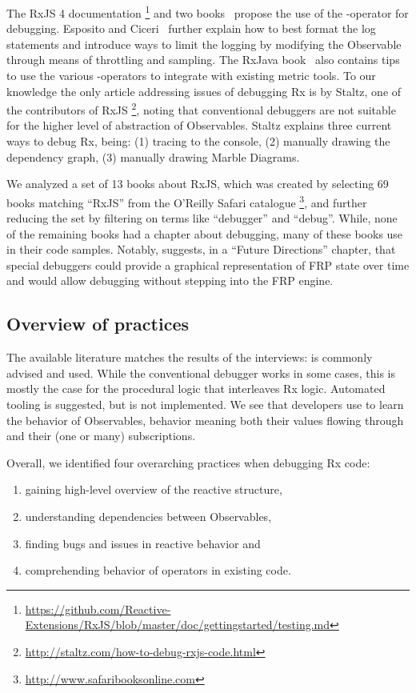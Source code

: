 The RxJS 4 documentation%
\footnote{ \url{https://github.com/Reactive-Extensions/RxJS/blob/master/doc/gettingstarted/testing.md}
} and two books~\cite{esposito2016reactive,rxjavabook2016} propose the
use of the -operator for debugging.  Esposito and Ciceri~\cite{esposito2016reactive}
further explain how to best format the log statements and introduce ways
to limit the logging by modifying the Observable through means of
throttling and sampling.  The RxJava book~\cite{rxjavabook2016} also
contains tips to use the various -operators to integrate with
existing metric tools.  To our knowledge the only article addressing
issues of debugging Rx is by Staltz, one of the contributors of RxJS%
\footnote{\url{http://staltz.com/how-to-debug-rxjs-code.html}}, noting
that conventional debuggers are not suitable for the higher level of
abstraction of Observables.  Staltz explains three current ways to debug
Rx, being:  (1) tracing to the console, (2) manually drawing the
dependency graph, (3) manually drawing Marble Diagrams.

We analyzed a set of 13 books about RxJS, which was created by selecting
69 books matching ``RxJS'' from the O'Reilly Safari catalogue%
\footnote{\url{http://www.safaribooksonline.com}}, and further reducing
the set by filtering on terms like ``debugger'' and ``debug''.  While,
none of the remaining books had a chapter about debugging, many of these
books use \printfdebugging{} in their code samples.  Notably,\cite{frpbook2016}
suggests, in a ``Future Directions'' chapter, that special debuggers
could provide a graphical representation of FRP state over time and
would allow debugging without stepping into the FRP engine.

\subsection{Overview of practices} The available literature matches the
results of the interviews:  \printfdebugging{} is commonly advised and
used.  While the conventional debugger works in some cases, this is
mostly the case for the procedural logic that interleaves Rx logic.
Automated tooling is suggested, but is not implemented.  We see that
developers use \printfdebugging{} to learn the behavior of Observables,
behavior meaning both their values flowing through and their (one or
many) subscriptions.

Overall, we identified four overarching practices when debugging Rx code:
\begin{enumerate}
        \itemsep0em
    \item[(1)]
        gaining high-level overview of the reactive structure,
    \item[(2)]
        understanding dependencies between Observables,
    \item[(3)]
        finding bugs and issues in reactive behavior and
    \item[(4)]
        comprehending behavior of operators in existing code.
\end{enumerate}

